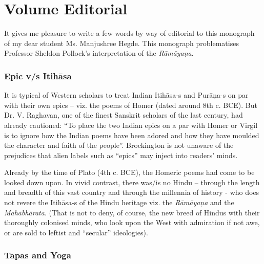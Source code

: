 \chapter*{Volume Editorial}\label{volume_editorial}



It gives me pleasure to write a few words by way of editorial to this monograph of my dear student Ms. Manjushree Hegde. This monograph problematises Professor Sheldon Pollock's interpretation of the {\sl Rāmāyaṇa}.\\[-20pt]

\subsection*{Epic v/s Itihāsa}

It is typical of Western scholars to treat Indian Itihāsa-s and Purāṇa-s on par with their own epics -- viz. the poems of Homer (dated around 8th c. BCE). But Dr. V. Raghavan, one of the finest Sanskrit scholars of the last century, had already cautioned: ``To place the two Indian epics on a par with Homer or Virgil is to ignore how the Indian poems have been adored and how they have moulded the character and faith of the people''. Brockington is not unaware of the prejudices that alien labels such as ``epics'' may inject into readers' minds. 
 
Already by the time of Plato (4th c. BCE), the Homeric poems had come to be looked down upon. In vivid contrast, there was/is no Hindu -- through  the length and breadth of this vast country and through the millennia of history - who does not revere the Itihāsa-s of the Hindu heritage viz. the {\sl Rāmāyaṇa} and the {\sl Mahābhārata}. (That is not to deny, of course, the new breed of Hindus with their thoroughly colonised minds, who look upon the West with admiration if not awe, or are sold to leftist and ``secular'' ideologies).\\[-20pt]

\subsection*{Tapas and Yoga}

